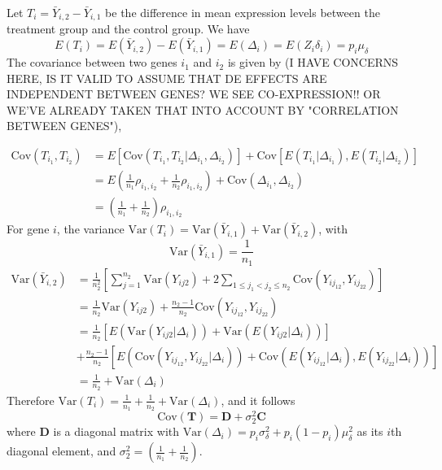 \documentclass[11pt, a4paper]{article}
\begin{document}
	Let $T_i=\bar{Y}_{i,2}-\bar{Y}_{i,1}$ be the difference in mean expression levels between the treatment group and the control group. We have 
	\[E(T_i) = E(\bar{Y}_{i,2})-E(\bar{Y}_{i,1}) = E(\Delta_i) = E(Z_i\delta_i) = p_i\mu_{\delta}\]
	The covariance between two genes $i_1$ and $i_2$ is given by (I HAVE CONCERNS HERE, IS IT VALID TO ASSUME THAT DE EFFECTS ARE INDEPENDENT BETWEEN GENES?  WE SEE CO-EXPRESSION!! OR WE'VE ALREADY TAKEN THAT INTO ACCOUNT BY "CORRELATION BETWEEN GENES"), 
	
				\begin{equation}
					\begin{aligned}
						\text{Cov}(T_{i_1}, T_{i_2}) & = E\left[\text{Cov}(T_{i_1}, T_{i_2}|\Delta_{i_1}, \Delta_{i_2}) \right]  + \text{Cov}\left[E(T_{i_1}|\Delta_{i_1}), E(T_{i_2}|\Delta_{i_2})\right] \\
						& = E\left(\frac{1}{n_1}\rho_{i_1,i_2} + \frac{1}{n_2}\rho_{i_1,i_2}\right) + \text{Cov}(\Delta_{i_1}, \Delta_{i_2})\\
						& = \left(\frac{1}{n_1} + \frac{1}{n_2}\right)\rho_{i_1,i_2}
					\end{aligned}
				\end{equation}
				For gene $i$, the variance $\text{Var}(T_i) = \text{Var}(\bar{Y}_{i, 1}) + \text{Var}(\bar{Y}_{i, 2})$, with
				\[\text{Var}(\bar{Y}_{i, 1}) = \frac{1}{n_1}\] 
				\begin{equation}
					\begin{aligned}
						\text{Var}(\bar{Y}_{i, 2}) & = \frac{1}{n_2^2}\left[\sum_{j=1}^{n_2}\text{Var}(Y_{ij2}) + 2\sum_{1\leq j_1<j_2 \leq n_2} \text{Cov}(Y_{ij_12}, Y_{ij_22})\right] \\
						& = \frac{1}{n_2}\text{Var}(Y_{ij2}) + \frac{n_2-1}{n_2} \text{Cov}(Y_{ij_12}, Y_{ij_22})\\
						& = \frac{1}{n_2}\left[E\left(\text{Var}(Y_{ij2}|\Delta_i)\right) + \text{Var}\left(E(Y_{ij2}|\Delta_i)\right)\right] \\ \text{~~~} &+\frac{n_2-1}{n_2}\left[E\left(\text{Cov}(Y_{ij_12}, Y_{ij_22}|\Delta_i)\right) + \text{Cov}\left(E(Y_{ij_12}|\Delta_i), E(Y_{ij_22}|\Delta_i)\right)\right] \\
						& = \frac{1}{n_2} + \text{Var}(\Delta_i)
					\end{aligned}
				\end{equation}
				Therefore $\text{Var}(T_i)  = \frac{1}{n_1} + \frac{1}{n_2} + \text{Var}(\Delta_i)$, and it follows 
				\begin{equation}\label{eq:tvar}
					\text{Cov}(\bm T) =  \bm D + \sigma_2^2\bm C 
				\end{equation}
				where $\bm D$ is a diagonal matrix with $\text{Var}(\Delta_i) =p_i\sigma_{\delta}^2 + p_i(1-p_i)\mu_{\delta}^2$ as its $i$th diagonal element, and $\sigma_2^2 = \left(\frac{1}{n_1} + \frac{1}{n_2}\right)$.

				
				
				
								
\newpage



	
\end{document}
